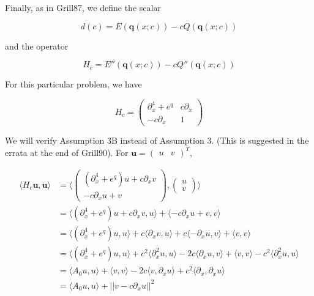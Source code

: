 \documentclass[12pt]{article}
\begin{document}
Finally, as in Grill87, we define the scalar

\begin{equation}\label{defd}
d(c) = E(\textbf{q}(x; c)) - c Q(\textbf{q}(x; c))
\end{equation}

and the operator 

\begin{equation}\label{defHc}
H_c = E''(\textbf{q}(x; c)) - c Q''(\textbf{q}(x; c))
\end{equation}

For this particular problem, we have

\begin{equation}
H_c = \begin{pmatrix}
\partial_x^4 + e^q & c \partial_x \\
-c \partial_x & 1
\end{pmatrix}
\end{equation}

We will verify Assumption 3B instead of Assumption 3. (This is suggested in the errata at the end of Grill90). For $\textbf{u} = \begin{pmatrix}u & v\end{pmatrix}^T$, 

\begin{align*}
\langle H_c \textbf{u}, \textbf{u} \rangle
&= \langle \begin{pmatrix} (\partial_x^4 + e^q)u + c \partial_x v \\ -c \partial_x u + v  \end{pmatrix},
\begin{pmatrix} u \\ v \end{pmatrix} \rangle \\ 
&= \langle (\partial_x^4 + e^q)u + c \partial_x v, u \rangle + \langle -c \partial_x u + v, v\rangle \\
&= \langle (\partial_x^4 + e^q)u, u \rangle + c \langle \partial_x v, u \rangle + c \langle -\partial_x u, v \rangle + \langle v, v \rangle \\
&= \langle (\partial_x^4 + e^q)u, u \rangle + c^2 \langle \partial_x^2 u, u \rangle - 2 c \langle \partial_x u, v \rangle + \langle v, v \rangle - c^2 \langle \partial_x^2 u, u \rangle\\
&= \langle A_0 u, u \rangle + \langle v, v \rangle - 2 c \langle v, \partial_x u \rangle + c^2 \langle \partial_x, \partial_x u \rangle\\
&= \langle A_0 u, u \rangle + || v - c \partial_x u||^2
\end{align*}
\end{document}
